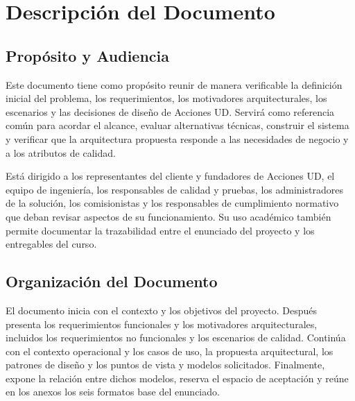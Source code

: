\documentclass[11pt,a4paper,oneside]{article}
\newcommand{\nombreSolucion}{Acciones UD}
\begin{document}
\section{Descripción del Documento}
\subsection{Propósito y Audiencia}
Este documento tiene como propósito reunir de manera verificable la definición inicial del problema, los requerimientos, los motivadores arquitecturales, los escenarios y las decisiones de diseño de \nombreSolucion. Servirá como referencia común para acordar el alcance, evaluar alternativas técnicas, construir el sistema y verificar que la arquitectura propuesta responde a las necesidades de negocio y a los atributos de calidad.

Está dirigido a los representantes del cliente y fundadores de Acciones UD, el equipo de ingeniería, los responsables de calidad y pruebas, los administradores de la solución, los comisionistas y los responsables de cumplimiento normativo que deban revisar aspectos de su funcionamiento. Su uso académico también permite documentar la trazabilidad entre el enunciado del proyecto y los entregables del curso.

\subsection{Organización del Documento}
El documento inicia con el contexto y los objetivos del proyecto. Después presenta los requerimientos funcionales y los motivadores arquitecturales, incluidos los requerimientos no funcionales y los escenarios de calidad. Continúa con el contexto operacional y los casos de uso, la propuesta arquitectural, los patrones de diseño y los puntos de vista y modelos solicitados. Finalmente, expone la relación entre dichos modelos, reserva el espacio de aceptación y reúne en los anexos los seis formatos base del enunciado.
\end{document}
